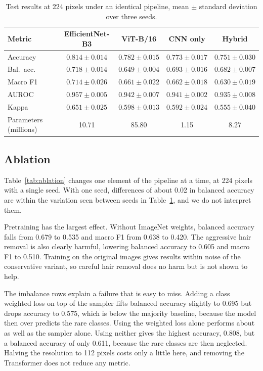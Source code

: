 \documentclass[runningheads]{llncs}
\begin{document}
\begin{table}[!htbp]
\centering
\caption{Test results at 224 pixels under an identical pipeline, mean $\pm$ standard deviation over three seeds.}
\label{tab:seeds}
\small\setlength{\tabcolsep}{4pt}
\begin{tabular}{lcccc}
\toprule
Metric & EfficientNet-B3 & ViT-B/16 & CNN only & Hybrid \\
\midrule
Accuracy    & $0.814 \pm 0.014$ & $0.782 \pm 0.015$ & $0.773 \pm 0.017$ & $0.751 \pm 0.030$ \\
Bal.\ acc.  & $0.718 \pm 0.014$ & $0.649 \pm 0.004$ & $0.693 \pm 0.016$ & $0.682 \pm 0.007$ \\
Macro F1    & $0.714 \pm 0.026$ & $0.661 \pm 0.022$ & $0.662 \pm 0.018$ & $0.630 \pm 0.019$ \\
AUROC       & $0.957 \pm 0.005$ & $0.942 \pm 0.007$ & $0.941 \pm 0.002$ & $0.935 \pm 0.008$ \\
Kappa       & $0.651 \pm 0.025$ & $0.598 \pm 0.013$ & $0.592 \pm 0.024$ & $0.555 \pm 0.040$ \\
Parameters (millions) & 10.71 & 85.80 & 1.15 & 8.27 \\
\bottomrule
\end{tabular}
\end{table}

\subsection{Ablation}

Table~\ref{tab:ablation} changes one element of the pipeline at a time, at 224 pixels with a single seed. With one seed, differences of about 0.02 in balanced accuracy are within the variation seen between seeds in Table~\ref{tab:seeds}, and we do not interpret them.

Pretraining has the largest effect. Without ImageNet weights, balanced accuracy falls from 0.679 to 0.535 and macro F1 from 0.638 to 0.420. The aggressive hair removal is also clearly harmful, lowering balanced accuracy to 0.605 and macro F1 to 0.510. Training on the original images gives results within noise of the conservative variant, so careful hair removal does no harm but is not shown to help.

The imbalance rows explain a failure that is easy to miss. Adding a class weighted loss on top of the sampler lifts balanced accuracy slightly to 0.695 but drops accuracy to 0.575, which is below the majority baseline, because the model then over predicts the rare classes. Using the weighted loss alone performs about as well as the sampler alone. Using neither gives the highest accuracy, 0.808, but a balanced accuracy of only 0.611, because the rare classes are then neglected. Halving the resolution to 112 pixels costs only a little here, and removing the Transformer does not reduce any metric.
\end{document}
